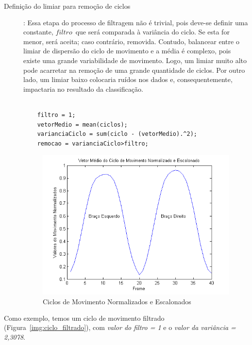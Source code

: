 \begin{description}
		
	\item [Definição do limiar para remoção de ciclos]: Essa etapa do processo de filtragem não é trivial, pois deve-se definir uma constante, $ filtro $\, que será comparada à variância do ciclo. Se esta for menor, será aceita; caso contrário, removida. Contudo, balancear entre o limiar de dispersão do ciclo de movimento e a média é complexo, pois existe uma grande variabilidade de movimento. Logo, um limiar muito alto pode acarretar na remoção de uma grande quantidade de ciclos. Por outro lado, um limiar baixo colocaria ruídos nos dados e, consequentemente, impactaria no resultado da classificação.	
	\lstset{language=Matlab}
	\begin{lstlisting}[frame=single, caption=Filtro dos Ciclos]  % Start your code-block
		
    filtro = 1;
    vetorMedio = mean(ciclos);
    varianciaCiclo = sum(ciclo - (vetorMedio).^2);
    remocao = varianciaCiclo>filtro;
	\end{lstlisting}
	
	\begin{figure}
     \centering
     \includegraphics[width=1\textwidth]{./img/vetormedionormalozadoescalonado.png}
     \caption{Ciclos de Movimento Normalizados e Escalonados}
		 \label{img:ciclos_normalizado_escalonado}
	\end{figure}
\end{description}


Como exemplo, temos um ciclo de movimento filtrado (Figura~\ref{img:ciclo_filtrado}), com \textit{valor do filtro = 1} e o \textit{valor da variância = 2,3078}.


